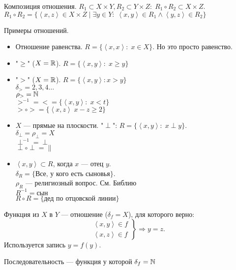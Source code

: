 \begin{definition}
    Композиция отношения. $R_1 \subset X \times Y, R_2 \subset Y \times Z: \; R_1 \circ R_2 \subset X \times Z$. \\
    $R_1 \circ R_2 = \{\left<x, z\right> \in X \times Z\; \vert \; \exists y \in Y: \; \left<x,y\right> \in R_1 \land \left<y,z\right> \in R_2\}$
\end{definition}
Примеры отношений. \begin{itemize}
    \item Отношение равенства. $R = \{\left<x,x\right>: \; x \in X\}$. Но это просто равенство.
    \item "$\ge$" ($X = \mathbb{R}$). $R = \{ \left<x,y\right>: \; x \ge y\}$
    \item "$>$" ($X= \mathbb{R}$). $R = \{\left<x,y\right>: x > y\}$ \\
        $\delta_{>} = {2,3,4\ldots}$\\
        $\rho_> = \mathbb{N}$\\
        $>^{-1} = < = \{\left<x,y\right>: \; x < t\}$ \\
        $> \circ > = \{\left<x,z\right>\; x-z\ge2\}$
    \item $X$ --- прямые на плоскости. "$\perp$":  $R = \{\left<x,y\right>: \; x \perp y\}$. \\
            $\delta_\perp = \rho_\perp = X$ \\
            $\perp^{-1} = \perp$\\
            $\perp \circ \perp = \|$
    \item $\left<x, y\right> \subset R$, когда  $x$ --- отец  $y$. \\ 
        $\delta_R = \{\text{Все, у кого есть сыновья}\}$. \\
        $\rho_R$ --- религиозный вопрос. См. Библию \\
        $R^{-1} = \text{сын}$ \\
        $R \circ R = \{\text{дед по отцовской линии}\}$
\end{itemize}
\begin{definition}
    Функция из $X$ в  $Y$ --- отношение ($\delta_f = X$), для которого верно:
     \[
         \left. \begin{array}{l} \left<x,y\right> \in f \\ \left<x, z\right> \in f \end{array} \right\} \Rightarrow y = z
    .\] 
    Используется запись $y = f(y)$.
\end{definition}
\begin{definition}
    Последовательность --- функция у которой $\delta_f = \mathbb{N}$
\end{definition}
